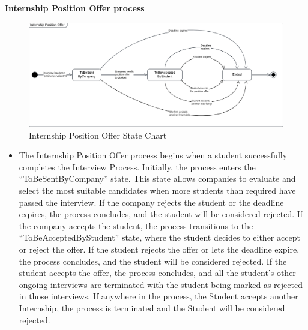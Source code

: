 \noindent\textbf{\color{titleColor}Internship Position Offer process}\\
\begin{figure}[H]
    \centering
    \includegraphics[width=1 \textwidth]{Latex/Images/InternshipPositionOfferStateChart.png}    
    \caption{Internship Position Offer State Chart}
    \label{fig:InternshipPositionOffer}
\end{figure}
\begin{itemize}
    \item The Internship Position Offer process begins when a student successfully completes the Interview Process. Initially, the process enters the “ToBeSentByCompany” state.
    This state allows companies to evaluate and select the most suitable candidates when more students than required have passed the interview.
    If the company rejects the student or the deadline expires, the process concludes, and the student will be considered rejected.
    If the company accepts the student, the process transitions to the “ToBeAcceptedByStudent” state, where the student decides to either accept or reject the offer.
    If the student rejects the offer or lets the deadline expire, the process concludes, and the student will be considered rejected.
    If the student accepts the offer, the process concludes, and all the student’s other ongoing interviews are terminated with the student being marked as rejected in those interviews.
    If anywhere in the process, the Student accepts another Internship, the process is terminated and the Student will be considered rejected.
\end{itemize}

